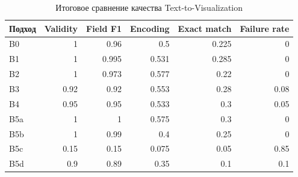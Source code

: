 \documentclass{article}
\begin{document}
\begin{table}[ht]
\centering
\caption{Итоговое сравнение качества Text-to-Visualization}
\begin{tabular}{lrrrrr}
\toprule
Подход & Validity & Field F1 & Encoding & Exact match & Failure rate \\
\midrule
B0 & 1 & 0.96 & 0.5 & 0.225 & 0 \\
B1 & 1 & 0.995 & 0.531 & 0.285 & 0 \\
B2 & 1 & 0.973 & 0.577 & 0.22 & 0 \\
B3 & 0.92 & 0.92 & 0.553 & 0.28 & 0.08 \\
B4 & 0.95 & 0.95 & 0.533 & 0.3 & 0.05 \\
B5a & 1 & 1 & 0.575 & 0.3 & 0 \\
B5b & 1 & 0.99 & 0.4 & 0.25 & 0 \\
B5c & 0.15 & 0.15 & 0.075 & 0.05 & 0.85 \\
B5d & 0.9 & 0.89 & 0.35 & 0.1 & 0.1 \\
\bottomrule
\end{tabular}
\end{table}
\end{document}
